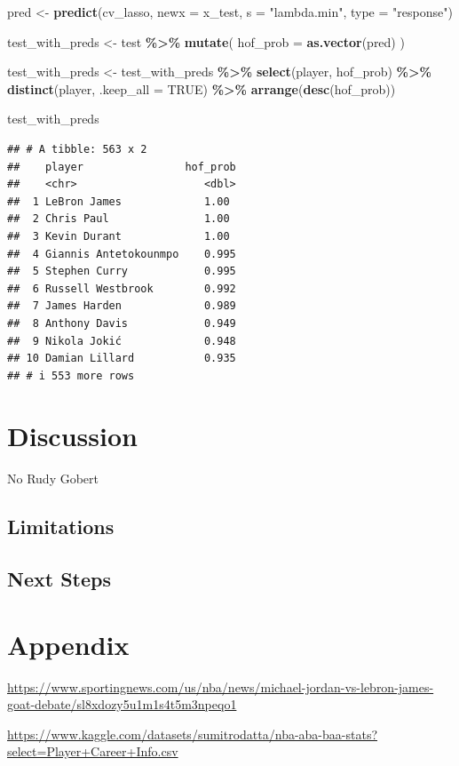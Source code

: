 \documentclass[
  11pt,
]{article}
\newenvironment{Shaded}{\begin{snugshade}}{\end{snugshade}}
\newcommand{\AttributeTok}[1]{\textcolor[rgb]{0.13,0.29,0.53}{#1}}
\newcommand{\ConstantTok}[1]{\textcolor[rgb]{0.56,0.35,0.01}{#1}}
\newcommand{\FunctionTok}[1]{\textcolor[rgb]{0.13,0.29,0.53}{\textbf{#1}}}
\newcommand{\NormalTok}[1]{#1}
\newcommand{\OtherTok}[1]{\textcolor[rgb]{0.56,0.35,0.01}{#1}}
\newcommand{\SpecialCharTok}[1]{\textcolor[rgb]{0.81,0.36,0.00}{\textbf{#1}}}
\newcommand{\StringTok}[1]{\textcolor[rgb]{0.31,0.60,0.02}{#1}}
\begin{document}
\begin{Shaded}
\begin{Highlighting}[]
\NormalTok{pred }\OtherTok{\textless{}{-}} \FunctionTok{predict}\NormalTok{(cv\_lasso, }\AttributeTok{newx =}\NormalTok{ x\_test, }\AttributeTok{s =} \StringTok{"lambda.min"}\NormalTok{, }\AttributeTok{type =} \StringTok{"response"}\NormalTok{)}

\NormalTok{test\_with\_preds }\OtherTok{\textless{}{-}}\NormalTok{ test }\SpecialCharTok{\%\textgreater{}\%}
  \FunctionTok{mutate}\NormalTok{(}
    \AttributeTok{hof\_prob =} \FunctionTok{as.vector}\NormalTok{(pred)}
\NormalTok{  )}

\NormalTok{test\_with\_preds }\OtherTok{\textless{}{-}}\NormalTok{ test\_with\_preds }\SpecialCharTok{\%\textgreater{}\%}
  \FunctionTok{select}\NormalTok{(player, hof\_prob) }\SpecialCharTok{\%\textgreater{}\%}
  \FunctionTok{distinct}\NormalTok{(player, }\AttributeTok{.keep\_all =} \ConstantTok{TRUE}\NormalTok{) }\SpecialCharTok{\%\textgreater{}\%} 
  \FunctionTok{arrange}\NormalTok{(}\FunctionTok{desc}\NormalTok{(hof\_prob))}
\end{Highlighting}
\end{Shaded}

\begin{Shaded}
\begin{Highlighting}[]
\NormalTok{test\_with\_preds}
\end{Highlighting}
\end{Shaded}

\begin{verbatim}
## # A tibble: 563 x 2
##    player                hof_prob
##    <chr>                    <dbl>
##  1 LeBron James             1.00 
##  2 Chris Paul               1.00 
##  3 Kevin Durant             1.00 
##  4 Giannis Antetokounmpo    0.995
##  5 Stephen Curry            0.995
##  6 Russell Westbrook        0.992
##  7 James Harden             0.989
##  8 Anthony Davis            0.949
##  9 Nikola Jokić             0.948
## 10 Damian Lillard           0.935
## # i 553 more rows
\end{verbatim}

\section{Discussion}\label{discussion}

No Rudy Gobert

\subsection{Limitations}\label{limitations}

\subsection{Next Steps}\label{next-steps}

\section{Appendix}\label{appendix}

\url{https://www.sportingnews.com/us/nba/news/michael-jordan-vs-lebron-james-goat-debate/sl8xdozy5u1m1s4t5m3npeqo1}

\url{https://www.kaggle.com/datasets/sumitrodatta/nba-aba-baa-stats?select=Player+Career+Info.csv}
\end{document}

